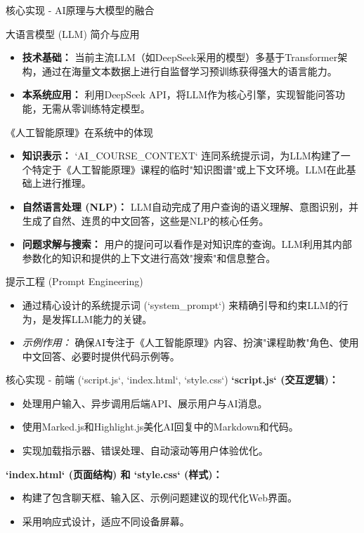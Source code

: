 \documentclass{beamer}
\begin{document}
\begin{frame}{核心实现 - AI原理与大模型的融合}
  \begin{block}{大语言模型 (LLM) 简介与应用}
    \begin{itemize}
        \item \textbf{技术基础：} 当前主流LLM（如DeepSeek采用的模型）多基于Transformer架构，通过在海量文本数据上进行自监督学习预训练获得强大的语言能力。
        \item \textbf{本系统应用：} 利用DeepSeek API，将LLM作为核心引擎，实现智能问答功能，无需从零训练特定模型。
    \end{itemize}
  \end{block}
  \begin{block}{《人工智能原理》在系统中的体现}
    \begin{itemize}
        \item \textbf{知识表示：} `AI_COURSE_CONTEXT` 连同系统提示词，为LLM构建了一个特定于《人工智能原理》课程的临时"知识图谱"或上下文环境。LLM在此基础上进行推理。
        \item \textbf{自然语言处理 (NLP)：} LLM自动完成了用户查询的语义理解、意图识别，并生成了自然、连贯的中文回答，这些是NLP的核心任务。
        \item \textbf{问题求解与搜索：} 用户的提问可以看作是对知识库的查询。LLM利用其内部参数化的知识和提供的上下文进行高效"搜索"和信息整合。
    \end{itemize}
  \end{block}
  \begin{block}{提示工程 (Prompt Engineering)}
    \begin{itemize}
        \item 通过精心设计的系统提示词 (`system_prompt`) 来精确引导和约束LLM的行为，是发挥LLM能力的关键。
        \item \textit{示例作用：} 确保AI专注于《人工智能原理》内容、扮演"课程助教"角色、使用中文回答、必要时提供代码示例等。
    \end{itemize}
  \end{block}
\end{frame}

\begin{frame}{核心实现 - 前端 (`script.js`, `index.html`, `style.css`)}
  \textbf{`script.js` (交互逻辑)：}
  \begin{itemize}
    \item 处理用户输入、异步调用后端API、展示用户与AI消息。
    \item 使用Marked.js和Highlight.js美化AI回复中的Markdown和代码。
    \item 实现加载指示器、错误处理、自动滚动等用户体验优化。
  \end{itemize}
  \textbf{`index.html` (页面结构) 和 `style.css` (样式)：}
  \begin{itemize}
    \item 构建了包含聊天框、输入区、示例问题建议的现代化Web界面。
    \item 采用响应式设计，适应不同设备屏幕。
  \end{itemize}
\end{frame}
\end{document}
